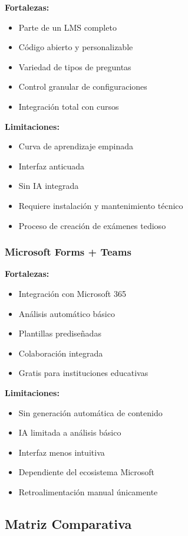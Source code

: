 \documentclass[12pt,a4paper]{report}
\begin{document}
\textbf{Fortalezas:}
\begin{itemize}
\item Parte de un LMS completo
\item Código abierto y personalizable
\item Variedad de tipos de preguntas
\item Control granular de configuraciones
\item Integración total con cursos
\end{itemize}

\textbf{Limitaciones:}
\begin{itemize}
\item Curva de aprendizaje empinada
\item Interfaz anticuada
\item Sin IA integrada
\item Requiere instalación y mantenimiento técnico
\item Proceso de creación de exámenes tedioso
\end{itemize}

\subsubsection{Microsoft Forms + Teams}

\textbf{Fortalezas:}
\begin{itemize}
\item Integración con Microsoft 365
\item Análisis automático básico
\item Plantillas prediseñadas
\item Colaboración integrada
\item Gratis para instituciones educativas
\end{itemize}

\textbf{Limitaciones:}
\begin{itemize}
\item Sin generación automática de contenido
\item IA limitada a análisis básico
\item Interfaz menos intuitiva
\item Dependiente del ecosistema Microsoft
\item Retroalimentación manual únicamente
\end{itemize}

\subsection{Matriz Comparativa}
\end{document}
